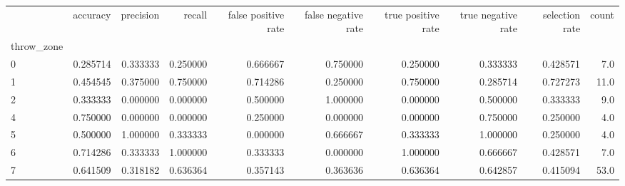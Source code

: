 \begin{tabular}{lrrrrrrrrr}
\toprule
{} &  accuracy &  precision &    recall &  false positive rate &  false negative rate &  true positive rate &  true negative rate &  selection rate &  count \\
throw\_zone &           &            &           &                      &                      &                     &                     &                 &        \\
\midrule
0          &  0.285714 &   0.333333 &  0.250000 &             0.666667 &             0.750000 &            0.250000 &            0.333333 &        0.428571 &    7.0 \\
1          &  0.454545 &   0.375000 &  0.750000 &             0.714286 &             0.250000 &            0.750000 &            0.285714 &        0.727273 &   11.0 \\
2          &  0.333333 &   0.000000 &  0.000000 &             0.500000 &             1.000000 &            0.000000 &            0.500000 &        0.333333 &    9.0 \\
4          &  0.750000 &   0.000000 &  0.000000 &             0.250000 &             0.000000 &            0.000000 &            0.750000 &        0.250000 &    4.0 \\
5          &  0.500000 &   1.000000 &  0.333333 &             0.000000 &             0.666667 &            0.333333 &            1.000000 &        0.250000 &    4.0 \\
6          &  0.714286 &   0.333333 &  1.000000 &             0.333333 &             0.000000 &            1.000000 &            0.666667 &        0.428571 &    7.0 \\
7          &  0.641509 &   0.318182 &  0.636364 &             0.357143 &             0.363636 &            0.636364 &            0.642857 &        0.415094 &   53.0 \\
\bottomrule
\end{tabular}
